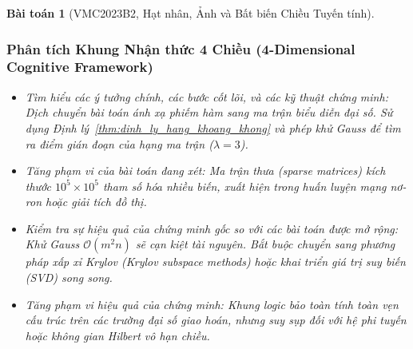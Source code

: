 \documentclass{article}
\newtheorem{baitoan}{Bài toán}
\begin{document}
\begin{baitoan}[VMC2023B2, Hạt nhân, Ảnh và Bất biến Chiều Tuyến tính]
 \subsubsection*{Phân tích Khung Nhận thức 4 Chiều (4-Dimensional Cognitive Framework)}
 \begin{itemize}
 \item \textit{Tìm hiểu các ý tưởng chính, các bước cốt lõi, và các kỹ thuật chứng minh}: Dịch chuyển bài toán ánh xạ phiếm hàm sang ma trận biểu diễn đại số. Sử dụng Định lý~\ref{thm:dinh_ly_hang_khoang_khong} và phép khử Gauss để tìm ra điểm gián đoạn của hạng ma trận ($\lambda = 3$).
 \item \textit{Tăng phạm vi của bài toán đang xét}: Ma trận thưa (sparse matrices) kích thước $10^5 \times 10^5$ tham số hóa nhiều biến, xuất hiện trong huấn luyện mạng nơ-ron hoặc giải tích đồ thị.
 \item \textit{Kiểm tra sự hiệu quả của chứng minh gốc so với các bài toán được mở rộng}: Khử Gauss $\mathcal{O}(m^2n)$ sẽ cạn kiệt tài nguyên. Bắt buộc chuyển sang phương pháp xấp xỉ Krylov (Krylov subspace methods) hoặc khai triển giá trị suy biến (SVD) song song.
 \item \textit{Tăng phạm vi hiệu quả của chứng minh}: Khung logic bảo toàn tính toàn vẹn cấu trúc trên các trường đại số giao hoán, nhưng suy sụp đối với hệ phi tuyến hoặc không gian Hilbert vô hạn chiều.
 \end{itemize}
\end{baitoan}
\end{document}

